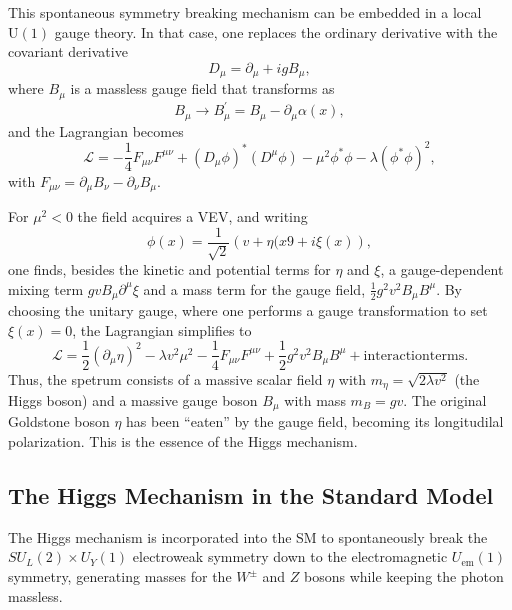 This spontaneous symmetry breaking mechanism can be embedded in a local $\mathrm{U}(1)$ gauge theory. In that case, one replaces the ordinary derivative with the covariant derivative
\begin{equation}
D_\mu = \partial_\mu + igB_\mu,
\end{equation}
where $B_\mu$ is a massless gauge field that transforms as
\begin{equation}
B_\mu \to B_\mu^\prime= B_\mu - \partial_\mu \alpha(x),
\end{equation}
and the Lagrangian becomes
\begin{equation}
\mathcal{L}=-\frac{1}{4}F_{\mu\nu}F^{\mu\nu}+(D_\mu\phi)^*(D^\mu\phi) - \mu^2\phi^*\phi - \lambda(\phi^*\phi)^2,
\end{equation}
with $F_{\mu\nu}=\partial_\mu B_\nu - \partial_\nu B_\mu$.

For $\mu^2<0$ the field acquires a VEV, and writing
\begin{equation}
\phi(x) = \frac{1}{\sqrt{2}} \left( v + \eta(x9 +i\xi(x)\right),
\end{equation}
one finds, besides the kinetic and potential terms for $\eta$ and $\xi$, a gauge-dependent mixing term $gvB_\mu\partial^\mu\xi$ and a mass term for the gauge field, $\frac{1}{2}g^2v^2B_\mu B^\mu$. By choosing the unitary gauge, where one performs a gauge transformation to set $\xi(x)=0$, the Lagrangian simplifies to
\begin{equation}
\mathcal{L}=\frac{1}{2}(\partial_\mu\eta)^2 - \lambda v^2\mu^2 - \frac{1}{4}F_{\mu\nu}F^{\mu\nu}+\frac{1}{2}g^2v^2B_\mu B^\mu + \mathrm{interaction terms}.
\end{equation}
Thus, the spetrum consists of a massive scalar field $\eta$ with $m_\eta=\sqrt{2\lambda v^2}$ (the Higgs boson) and a massive gauge boson $B_\mu$ with mass $m_B=gv$. The original Goldstone boson $\eta$ has been ``eaten'' by the gauge field, becoming its longitudilal polarization. This is the essence of the Higgs mechanism.


\subsection{The Higgs Mechanism in the Standard Model}

The Higgs mechanism is incorporated into the SM to spontaneously break the $SU_L(2) \times U_Y(1)$ electroweak symmetry down to the electromagnetic $U_\mathrm{em}(1)$ symmetry, generating masses for the $W^\pm$ and $Z$ bosons while keeping the photon massless.

